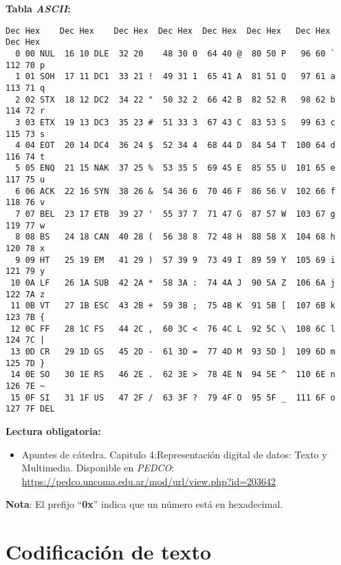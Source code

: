 \documentclass[12pt]{article}
\begin{document}
\textbf{Tabla \emph{ASCII}:}
\begin{verbatim}
Dec Hex    Dec Hex    Dec Hex  Dec Hex  Dec Hex  Dec Hex   Dec Hex   Dec Hex  
  0 00 NUL  16 10 DLE  32 20    48 30 0  64 40 @  80 50 P   96 60 `  112 70 p
  1 01 SOH  17 11 DC1  33 21 !  49 31 1  65 41 A  81 51 Q   97 61 a  113 71 q
  2 02 STX  18 12 DC2  34 22 "  50 32 2  66 42 B  82 52 R   98 62 b  114 72 r
  3 03 ETX  19 13 DC3  35 23 #  51 33 3  67 43 C  83 53 S   99 63 c  115 73 s
  4 04 EOT  20 14 DC4  36 24 $  52 34 4  68 44 D  84 54 T  100 64 d  116 74 t
  5 05 ENQ  21 15 NAK  37 25 %  53 35 5  69 45 E  85 55 U  101 65 e  117 75 u
  6 06 ACK  22 16 SYN  38 26 &  54 36 6  70 46 F  86 56 V  102 66 f  118 76 v
  7 07 BEL  23 17 ETB  39 27 '  55 37 7  71 47 G  87 57 W  103 67 g  119 77 w
  8 08 BS   24 18 CAN  40 28 (  56 38 8  72 48 H  88 58 X  104 68 h  120 78 x
  9 09 HT   25 19 EM   41 29 )  57 39 9  73 49 I  89 59 Y  105 69 i  121 79 y
 10 0A LF   26 1A SUB  42 2A *  58 3A :  74 4A J  90 5A Z  106 6A j  122 7A z
 11 0B VT   27 1B ESC  43 2B +  59 3B ;  75 4B K  91 5B [  107 6B k  123 7B {
 12 0C FF   28 1C FS   44 2C ,  60 3C <  76 4C L  92 5C \  108 6C l  124 7C |
 13 0D CR   29 1D GS   45 2D -  61 3D =  77 4D M  93 5D ]  109 6D m  125 7D }
 14 0E SO   30 1E RS   46 2E .  62 3E >  78 4E N  94 5E ^  110 6E n  126 7E ~
 15 0F SI   31 1F US   47 2F /  63 3F ?  79 4F O  95 5F _  111 6F o  127 7F DEL
\end{verbatim}

\textbf{Lectura obligatoria:}

\vspace{-2\topsep}
\begin{itemize}

    \itemsep2pt \parskip0pt 

    \item Apuntes de cátedra. Capitulo 4:Representación digital de datos:
        Texto y Multimedia. Disponible en \textit{PEDCO}:
        \url{https://pedco.uncoma.edu.ar/mod/url/view.php?id=203642}

\end{itemize}

\textbf{Nota}: El prefijo ``\textbf{0x}'' indica que un número está en
hexadecimal.

\section{Codificación de texto}
\end{document}
